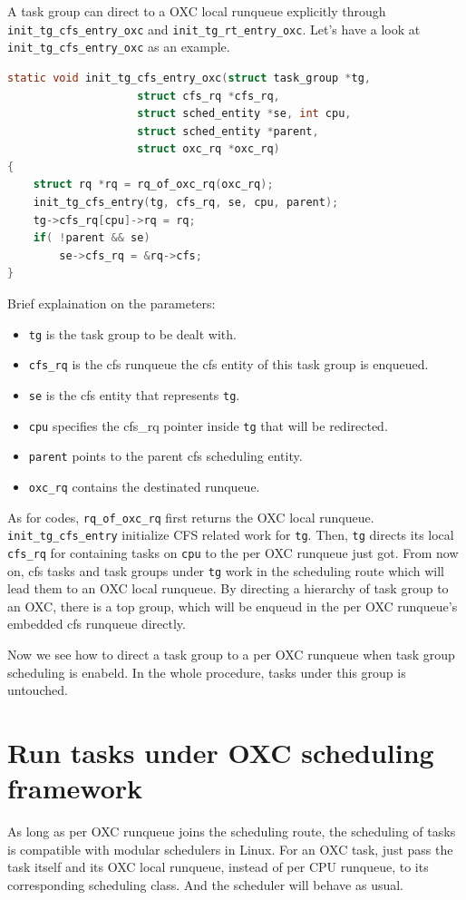 A task group can direct to a OXC local runqueue explicitly through 
\texttt{init\_tg\_cfs\_entry\_oxc} and \texttt{init\_tg\_rt\_entry\_oxc}.
Let's have a look at \texttt{init\_tg\_cfs\_entry\_oxc} as an example.
\begin{lstlisting}[language=C, caption={To explicitlt direct a task group 
						to an OXC local runqueue}]
static void init_tg_cfs_entry_oxc(struct task_group *tg,
					struct cfs_rq *cfs_rq,
					struct sched_entity *se, int cpu,
					struct sched_entity *parent,
					struct oxc_rq *oxc_rq)
{
	struct rq *rq = rq_of_oxc_rq(oxc_rq);
	init_tg_cfs_entry(tg, cfs_rq, se, cpu, parent);
	tg->cfs_rq[cpu]->rq = rq;
	if( !parent && se)
		se->cfs_rq = &rq->cfs;
} 
\end{lstlisting}
Brief explaination on the parameters:
\begin{itemize}
\item \texttt{tg} is the task group to be dealt with.
\item \texttt{cfs\_rq} is the cfs runqueue the cfs entity of this task
		group is enqueued. 
\item \texttt{se} is the cfs entity that represents \texttt{tg}.
\item \texttt{cpu} specifies the cfs\_rq pointer inside \texttt{tg} that
		will be redirected.
\item \texttt{parent} points to the parent cfs scheduling entity.
\item \texttt{oxc\_rq} contains the destinated runqueue. 
\end{itemize}
As for codes, \texttt{rq\_of\_oxc\_rq} first returns the OXC local runqueue.
\texttt{init\_tg\_cfs\_entry} initialize CFS related work for \texttt{tg}.
Then, \texttt{tg} directs its local \texttt{cfs\_rq} for containing 
tasks on \texttt{cpu} to the per OXC runqueue just got. From now on, cfs 
tasks and task groups under \texttt{tg} work in the scheduling route which
will lead them to an OXC local runqueue. By directing a hierarchy of task
group to an OXC, there is a top group, which will be enqueud in the per
OXC runqueue's embedded cfs runqueue directly.

Now we see how to direct a task group to a per OXC runqueue when task group
scheduling is enabeld. In the whole procedure, tasks under this group is 
untouched.

\section{Run tasks under OXC scheduling framework}
As long as per OXC runqueue joins the scheduling route, the scheduling 
of tasks is compatible with modular schedulers in Linux. For an OXC task,
just pass the task itself and its OXC local runqueue, instead of per CPU
runqueue, to its corresponding scheduling class. And the scheduler will
behave as usual.

